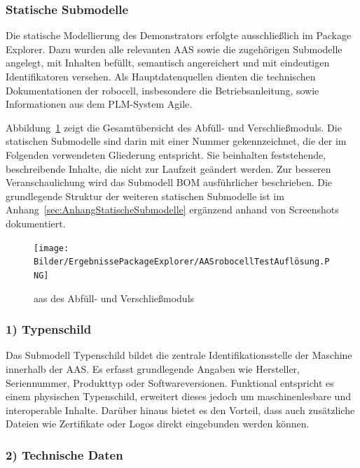 \subsubsection{Statische Submodelle}
Die statische Modellierung des Demonstrators erfolgte ausschließlich im Package Explorer.
Dazu wurden alle relevanten AAS sowie die zugehörigen Submodelle angelegt, mit Inhalten befüllt, semantisch angereichert und mit eindeutigen Identifikatoren versehen.
Als Hauptdatenquellen dienten die technischen Dokumentationen der robocell, insbesondere die Betriebsanleitung, sowie Informationen aus dem PLM-System Agile.

Abbildung~\ref{fig:PackageExplorerRobocell} zeigt die Gesamtübersicht des Abfüll- und Verschließmoduls. 
Die statischen Submodelle sind darin mit einer Nummer gekennzeichnet, die der im Folgenden verwendeten Gliederung entspricht. 
Sie beinhalten feststehende, beschreibende Inhalte, die nicht zur Laufzeit geändert werden. 
Zur besseren Veranschaulichung wird das Submodell BOM ausführlicher beschrieben.
Die grundlegende Struktur der weiteren statischen Submodelle ist im Anhang~\ref{sec:AnhangStatischeSubmodelle} ergänzend anhand von Screenshots dokumentiert.

\begin{figure}[htbp]
    \centering
        \texttt{[image: Bilder/ErgebnissePackageExplorer/AASrobocellTestAuflösung.PNG]}
    \caption{\acs{aas} des Abfüll- und Verschließmoduls}
    \label{fig:PackageExplorerRobocell}
\end{figure}

\subsubsection*{1) Typenschild}
\vspace{-0.5em} 
Das Submodell Typenschild bildet die zentrale Identifikationsstelle der Maschine innerhalb der AAS. 
Es erfasst grundlegende Angaben wie Hersteller, Seriennummer, Produkttyp oder Softwareversionen. 
Funktional entspricht es einem physischen Typenschild, erweitert dieses jedoch um maschinenlesbare und interoperable Inhalte. 
Darüber hinaus bietet es den Vorteil, dass auch zusätzliche Dateien wie Zertifikate oder Logos direkt eingebunden werden können.

\subsubsection*{2) Technische Daten}
\vspace{-0.5em}

